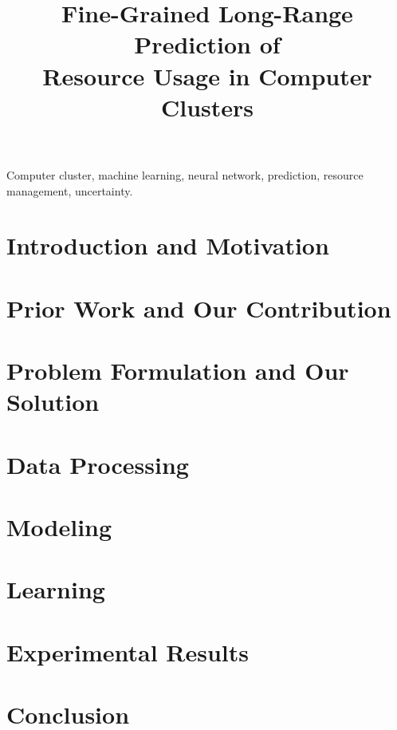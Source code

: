 \documentclass[journal]{IEEEtran}
\title{
  Fine-Grained Long-Range Prediction of\\
  Resource Usage in Computer Clusters
}
\author{}
\begin{document}
  \maketitle

  \begin{abstract}
    
  \end{abstract}

  \begin{IEEEkeywords}
    Computer cluster,
    machine learning,
    neural network,
    prediction,
    resource management,
    uncertainty.
  \end{IEEEkeywords}


  \section{Introduction and Motivation} 
  

  
  \section{Prior Work and Our Contribution} 
  

  \section{Problem Formulation and Our Solution} 
  

  \section{Data Processing} 
  

  \section{Modeling} 
  

  \section{Learning} 
  

  \section{Experimental Results} 
  

  \section{Conclusion} 
  
  

  \begingroup
    \linespread{0.9}
    
    
  \endgroup
\end{document}
